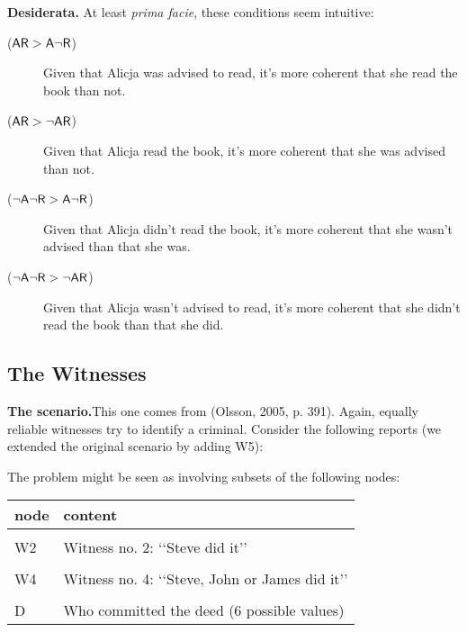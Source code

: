 \documentclass[10pt,]{scrartcl}
\newcommand{\s}[1]{\mbox{\textsf{#1}}}
\begin{document}
\noindent \textbf{Desiderata. } At least \emph{prima facie}, these
conditions seem intuitive: \vspace{2mm}

\begin{description}
    \item[($\s{AR}>\s{A}\neg\s{R}$)] Given that Alicja was advised to read, it's more coherent that she read the book than not. 
    \item[($\s{AR}>\neg\s{AR}$) ] Given that Alicja read the book, it's more coherent that she was advised than not. 
    \item[($\neg\s{A}\neg\s{R}>\s{A}\neg\s{R}$) ] Given that Alicja didn't read the book, it's more coherent that she wasn't advised than that she was. 
    \item[($\neg\s{A}\neg\s{R}>\neg\s{AR}$)] Given that Alicja wasn't advised to read, it's more coherent that she didn't read the book than that she did. 
\end{description}

\vspace{2mm}

\subsection{The Witnesses}

\textbf{The scenario.}This one comes from (Olsson, 2005, p. 391). Again,
equally reliable witnesses try to identify a criminal. Consider the
following reports (we extended the original scenario by adding \s{W5}):

The problem might be seen as involving subsets of the following nodes:

\begin{table}[H]
\centering
\begin{tabular}{ll}
\toprule
node & content\\
\midrule
\cellcolor{gray!6}{W1} & \cellcolor{gray!6}{Witness no. 1: ‘‘Steve did it’’}\\
W2 & Witness no. 2: ‘‘Steve did it’’\\
\cellcolor{gray!6}{W3} & \cellcolor{gray!6}{Witness no. 3: ‘‘Steve, Martin or David did it’’}\\
W4 & Witness no. 4: ‘‘Steve, John or James did it’’\\
\cellcolor{gray!6}{W5} & \cellcolor{gray!6}{Wittness no. 5: ‘‘Steve, John or Peter did it’’}\\
D & Who committed the deed (6  possible values)\\
\bottomrule
\end{tabular}
\end{table}
\end{document}

